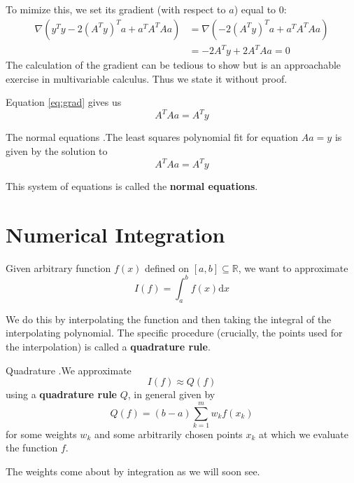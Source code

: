 \documentclass[12pt,letterpaper]{article}
\newcommand{\R}{\mathbb{R}}
\newcommand{\dd}{\mathrm{d}}
\begin{document}
To mimize this, we set its gradient (with respect to $a$) equal to $0$:
\begin{align}
	\nabla (y^T y - 2(A^T y)^T a + a^T A^T A a) &= \nabla (- 2(A^T y)^T a + a^T A^T A a) \\
	&= -2A^T y + 2A^TAa = 0 \label{eq:grad}
\end{align}
The calculation of the gradient can be tedious to show but is an approachable exercise in multivariable calculus. Thus we state it without proof.

Equation \ref{eq:grad} gives us
\begin{equation}
	A^T A a = A^T y
\end{equation}

\begin{theo}{The normal equations}
.The least squares polynomial fit for equation $Aa = y$ is given by the solution to
\begin{equation}
	A^T A a = A^T y
\end{equation}

This system of equations is called the \textbf{normal equations}.
\label{thm:normal_eqns}
\end{theo}


\section{Numerical Integration}

Given arbitrary function $f(x)$ defined on $[a,b] \subseteq \R$, we want to approximate
\begin{equation}
	I(f) = \int_a^b f(x) \dd x
\end{equation}

We do this by interpolating the function and then taking the integral of the interpolating polynomial. The specific procedure (crucially, the points used for the interpolation) is called a \textbf{quadrature rule}.

\begin{defn}{Quadrature}
.We approximate $$I(f) \approx Q(f)$$
using a \textbf{quadrature rule} $Q$, in general given by
\begin{equation}\label{eq:quadrature}
	Q(f) = (b-a) \sum_{k=1}^m w_k f(x_k)
\end{equation}
for some weights $w_k$ and some arbitrarily chosen points $x_k$ at which we evaluate the function $f$.
\label{def:quadrature}
\end{defn}
The weights come about by integration as we will soon see.
\end{document}
